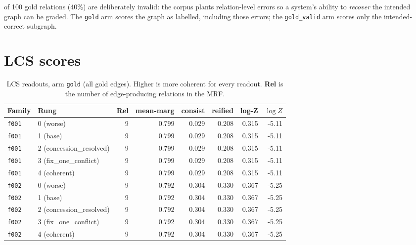\documentclass[11pt]{article}
\begin{document}
 of 100 gold relations (40\%) are deliberately invalid: the corpus plants relation-level errors so a system's ability to \emph{recover} the intended graph can be graded. The \texttt{gold} arm scores the graph as labelled, including those errors; the \texttt{gold\_valid} arm scores only the intended-correct subgraph.

\section{LCS scores}

\begin{table}[htbp]
\centering
\small
\caption{LCS readouts, arm \texttt{gold} (all gold edges). Higher is more coherent for every readout. \textbf{Rel} is the number of edge-producing relations in the MRF.}
\label{tab:scores-gold}
\begin{tabular}{llrrrrrr}
\toprule
Family & Rung & Rel & \textbf{mean-marg} & \textbf{consist} & \textbf{reified} & \textbf{log-Z} & $\log Z$ \\
\midrule
\texttt{f001} & 0 (worse) & 9 & 0.799 & 0.029 & 0.208 & 0.315 & -5.11 \\
\texttt{f001} & 1 (base) & 9 & 0.799 & 0.029 & 0.208 & 0.315 & -5.11 \\
\texttt{f001} & 2 (concession\_resolved) & 9 & 0.799 & 0.029 & 0.208 & 0.315 & -5.11 \\
\texttt{f001} & 3 (fix\_one\_conflict) & 9 & 0.799 & 0.029 & 0.208 & 0.315 & -5.11 \\
\texttt{f001} & 4 (coherent) & 9 & 0.799 & 0.029 & 0.208 & 0.315 & -5.11 \\
\midrule
\texttt{f002} & 0 (worse) & 9 & 0.792 & 0.304 & 0.330 & 0.367 & -5.25 \\
\texttt{f002} & 1 (base) & 9 & 0.792 & 0.304 & 0.330 & 0.367 & -5.25 \\
\texttt{f002} & 2 (concession\_resolved) & 9 & 0.792 & 0.304 & 0.330 & 0.367 & -5.25 \\
\texttt{f002} & 3 (fix\_one\_conflict) & 9 & 0.792 & 0.304 & 0.330 & 0.367 & -5.25 \\
\texttt{f002} & 4 (coherent) & 9 & 0.792 & 0.304 & 0.330 & 0.367 & -5.25 \\
\bottomrule
\end{tabular}
\end{table}
\end{document}
